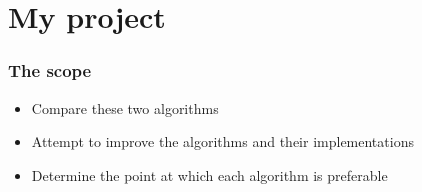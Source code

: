 \documentclass[10pt]{beamer}
\begin{document}
\section{My project}
\begin{frame}
    \frametitle{The scope}
    \begin{itemize}
        \item<1-> Compare these two algorithms
        \item<2-> Attempt to improve the algorithms and their implementations
        \item<3-> Determine the point at which each algorithm is preferable
    \end{itemize}
\end{frame}
\end{document}
